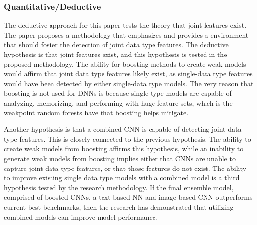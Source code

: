 \subsubsection{Quantitative/Deductive}

The deductive approach for this paper tests the theory that joint features exist.  The paper proposes a methodology that emphasizes and provides a environment that should foster the detection of joint data type features.  The deductive hypothesis is that joint features exist, and this hypothesis is tested in the proposed methodology.  The ability for boosting methods to create weak models would affirm that joint data type features likely exist, as single-data type features would have been detected by either single-data type models.  The very reason that boosting is not used for DNNs is because single type models are capable of analyzing, memorizing, and performing with huge feature sets, which is the weakpoint random forests have that boosting helps mitigate.

Another hypothesis is that a combined CNN is capable of detecting joint data type features.  This is closely connected to the previous hypothesis.  The ability to create weak models from boosting affirms this hypothesis, while an inability to generate weak models from boosting implies either that CNNs are unable to capture joint data type features, or that those features do not exist.  The ability to improve existing single data type models with a combined model is a third hypothesis tested by the research methodology.  If the final ensemble model, comprised of boosted CNNs, a text-based NN and image-based CNN outperforms current best-benchmarks, then the research has demonstrated that utilizing combined models can improve model performance.


